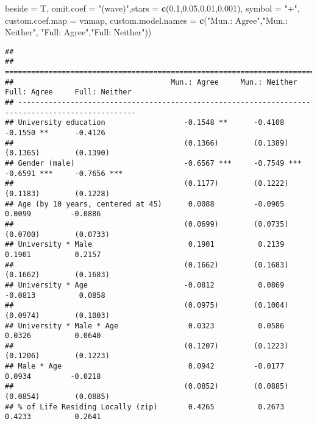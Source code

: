 \documentclass[
]{article}
\newenvironment{Shaded}{\begin{snugshade}}{\end{snugshade}}
\newcommand{\DataTypeTok}[1]{\textcolor[rgb]{0.13,0.29,0.53}{#1}}
\newcommand{\FloatTok}[1]{\textcolor[rgb]{0.00,0.00,0.81}{#1}}
\newcommand{\KeywordTok}[1]{\textcolor[rgb]{0.13,0.29,0.53}{\textbf{#1}}}
\newcommand{\NormalTok}[1]{#1}
\newcommand{\StringTok}[1]{\textcolor[rgb]{0.31,0.60,0.02}{#1}}
\begin{document}
\begin{Shaded}
\begin{Highlighting}[]
          \DataTypeTok{beside =}\NormalTok{ T,}
          \DataTypeTok{omit.coef =} \StringTok{"(wave)"}\NormalTok{,}\DataTypeTok{stars =} \KeywordTok{c}\NormalTok{(}\FloatTok{0.1}\NormalTok{,}\FloatTok{0.05}\NormalTok{,}\FloatTok{0.01}\NormalTok{,}\FloatTok{0.001}\NormalTok{), }\DataTypeTok{symbol =} \StringTok{"+"}\NormalTok{,}
          \DataTypeTok{custom.coef.map =}\NormalTok{ vnmap,}
          \DataTypeTok{custom.model.names =} \KeywordTok{c}\NormalTok{(}\StringTok{"Mun.: Agree"}\NormalTok{,}\StringTok{"Mun.: Neither"}\NormalTok{,}
                                 \StringTok{"Full: Agree"}\NormalTok{,}\StringTok{"Full: Neither"}\NormalTok{))}
\end{Highlighting}
\end{Shaded}

\begin{verbatim}
## 
## =================================================================================================
##                                    Mun.: Agree     Mun.: Neither   Full: Agree     Full: Neither 
## -------------------------------------------------------------------------------------------------
## University education                  -0.1548 **      -0.4108         -0.1550 **      -0.4126    
##                                       (0.1366)        (0.1389)        (0.1365)        (0.1390)   
## Gender (male)                         -0.6567 ***     -0.7549 ***     -0.6591 ***     -0.7656 ***
##                                       (0.1177)        (0.1222)        (0.1183)        (0.1228)   
## Age (by 10 years, centered at 45)      0.0088         -0.0905          0.0099         -0.0886    
##                                       (0.0699)        (0.0735)        (0.0700)        (0.0733)   
## University * Male                      0.1901          0.2139          0.1901          0.2157    
##                                       (0.1662)        (0.1683)        (0.1662)        (0.1683)   
## University * Age                      -0.0812          0.0869         -0.0813          0.0858    
##                                       (0.0975)        (0.1004)        (0.0974)        (0.1003)   
## University * Male * Age                0.0323          0.0586          0.0326          0.0640    
##                                       (0.1207)        (0.1223)        (0.1206)        (0.1223)   
## Male * Age                             0.0942         -0.0177          0.0934         -0.0218    
##                                       (0.0852)        (0.0885)        (0.0854)        (0.0885)   
## % of Life Residing Locally (zip)       0.4265          0.2673          0.4233          0.2641    

\end{verbatim}
\end{document}

